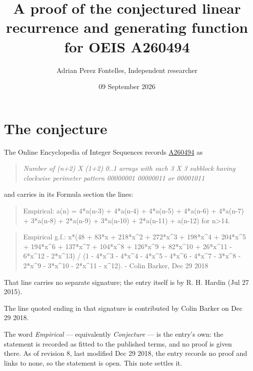 \documentclass[11pt]{article}
\title{A proof of the conjectured linear recurrence and generating function for OEIS A260494}
\author{Adrian Perez Fontelles, Independent researcher}
\date{09 September 2026}
\theoremstyle{definition}
\begin{document}
\maketitle
\section{The conjecture}

The Online Encyclopedia of Integer Sequences records \href{https://oeis.org/A260494}{A260494} as

\begin{quote}\itshape Number of (n+2) X (1+2) 0..1 arrays with each 3 X 3 subblock having clockwise perimeter pattern 00000001 00000011 or 00001011\end{quote}

and carries in its Formula section the lines:

\begin{quote}\ttfamily Empirical: a(n) = 4*a(n-3) + 4*a(n-4) + 4*a(n-5) + 4*a(n-6) + 4*a(n-7) + 3*a(n-8) + 2*a(n-9) + 3*a(n-10) + 2*a(n-11) + a(n-12) for n>14.\end{quote}

\begin{quote}\ttfamily Empirical g.f.: x*(48 + 83*x + 218*x\textasciicircum{}2 + 272*x\textasciicircum{}3 + 198*x\textasciicircum{}4 + 204*x\textasciicircum{}5 + 194*x\textasciicircum{}6 + 137*x\textasciicircum{}7 + 104*x\textasciicircum{}8 + 126*x\textasciicircum{}9 + 82*x\textasciicircum{}10 + 26*x\textasciicircum{}11 - 6*x\textasciicircum{}12 - 2*x\textasciicircum{}13) / (1 - 4*x\textasciicircum{}3 - 4*x\textasciicircum{}4 - 4*x\textasciicircum{}5 - 4*x\textasciicircum{}6 - 4*x\textasciicircum{}7 - 3*x\textasciicircum{}8 - 2*x\textasciicircum{}9 - 3*x\textasciicircum{}10 - 2*x\textasciicircum{}11 - x\textasciicircum{}12). - Colin Barker, Dec 29 2018\end{quote}

That line carries no separate signature; the entry itself is by R. H. Hardin (Jul 27 2015).

The line quoted ending in that signature is contributed by Colin Barker on Dec 29 2018.

The word {\itshape Empirical} --- equivalently {\itshape Conjecture} --- is the entry's own: the statement is recorded as fitted to the published terms, and no proof is given there. As of revision 8, last modified Dec 29 2018, the entry records no proof and links to none, so the statement is open. This note settles it.
\end{document}
